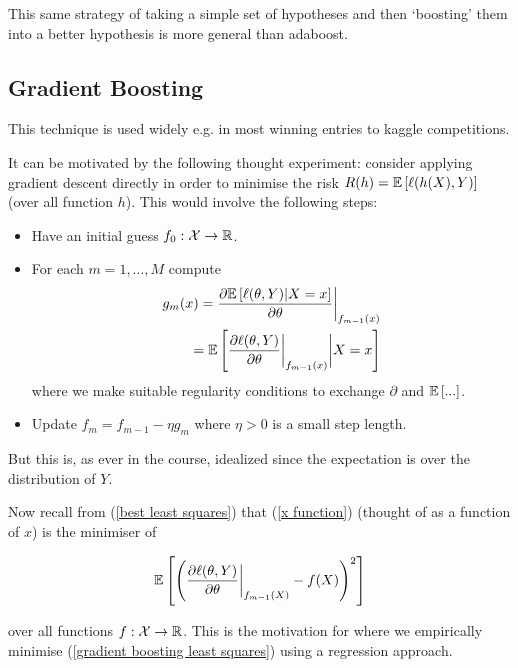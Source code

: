 \documentclass[11pt]{scrartcl}
\begin{document}
This same strategy of taking a simple set of hypotheses and then `boosting' them into a better hypothesis is more general than adaboost.

\subsection{Gradient Boosting}

This technique is used widely e.g. in most winning entries to kaggle competitions.

It can be motivated by the following thought experiment: consider applying gradient descent directly in order to minimise the risk $R(h)= \mathbb{E} \left[ \ell(h(X), Y) \right]$ (over all function $h$). This would involve the following steps:

\begin{itemize}
    \item Have an initial guess $f_0 : \mathcal{X} \rightarrow \mathbb R$.
    \item For each $m=1,...,M$ compute
    \begin{align}
        g_m(x) = \frac{\partial \mathbb{E} \left[ \ell(\theta, Y) | X=x \right]}{\partial \theta} \bigg\vert_{f_{m-1}(x)} \\
        = \mathbb{E} \left[ \frac{\partial \ell (\theta , Y)}{\partial \theta} \bigg\vert_{f_{m-1}(x)} \bigg\vert X=x \right]
        \label{x function}
    \end{align}
    where we make suitable regularity conditions to exchange $\partial$ and $\mathbb{E} \left[  ...  \right]$.
    \item Update $f_m = f_{m-1} - \eta g_m$ where $\eta > 0$ is a small step length.
 \end{itemize}

But this is, as ever in the course, idealized since the expectation is over the distribution of $Y$. 

Now recall from (\ref{best least squares}) that (\ref{x function}) (thought of as a function of $x$) is the minimiser of

\begin{equation}
    \mathbb{E} \left[ \left( \frac{\partial \ell (\theta , Y)}{\partial \theta} \bigg\vert_{f_{m-1}(X)} - f(X) \right)^2 \right]
\label{gradient boosting least squares}
\end{equation} %

over all functions $f : \mathcal{X} \rightarrow \mathbb R$. This is the motivation for  where we empirically minimise (\ref{gradient boosting least squares}) using a regression approach.
\end{document}

